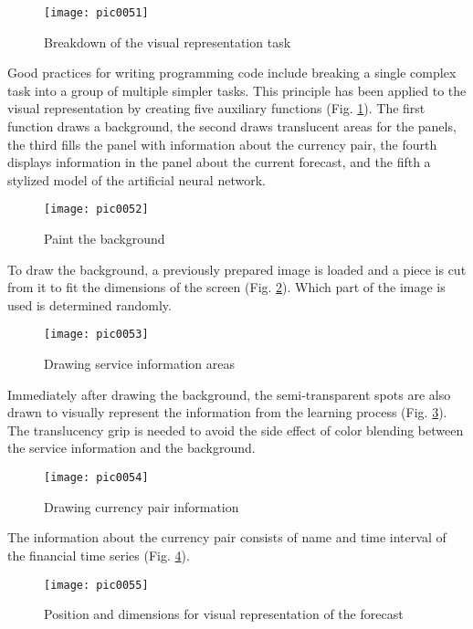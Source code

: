 \begin{figure}[h]
\centering
\texttt{[image: pic0051]}
\caption{Breakdown of the visual representation task}
\label{fig:pic0051}
\end{figure}
\FloatBarrier

Good practices for writing programming code include breaking a single complex task into a group of multiple simpler tasks. This principle has been applied to the visual representation by creating five auxiliary functions (Fig. \ref{fig:pic0051}). The first function draws a background, the second draws translucent areas for the panels, the third fills the panel with information about the currency pair, the fourth displays information in the panel about the current forecast, and the fifth a stylized model of the artificial neural network.

\begin{figure}[h]
\centering
\texttt{[image: pic0052]}
\caption{Paint the background}
\label{fig:pic0052}
\end{figure}
\FloatBarrier

To draw the background, a previously prepared image is loaded and a piece is cut from it to fit the dimensions of the screen (Fig. \ref{fig:pic0052}). Which part of the image is used is determined randomly.

\begin{figure}[h]
\centering
\texttt{[image: pic0053]}
\caption{Drawing service information areas}
\label{fig:pic0053}
\end{figure}
\FloatBarrier

Immediately after drawing the background, the semi-transparent spots are also drawn to visually represent the information from the learning process (Fig. \ref{fig:pic0053}). The translucency grip is needed to avoid the side effect of color blending between the service information and the background.

\begin{figure}[h]
\centering
\texttt{[image: pic0054]}
\caption{Drawing currency pair information}
\label{fig:pic0054}
\end{figure}
\FloatBarrier

The information about the currency pair consists of name and time interval of the financial time series (Fig. \ref{fig:pic0054}).

\begin{figure}[h]
\centering
\texttt{[image: pic0055]}
\caption{Position and dimensions for visual representation of the forecast}
\label{fig:pic0055}
\end{figure}
\FloatBarrier

